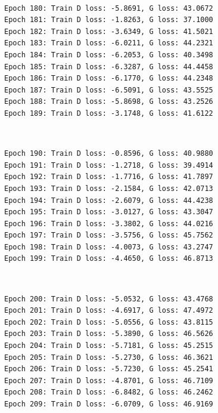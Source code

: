 \documentclass[11pt]{article}
\begin{document}
    \begin{center}
    \end{center}
    { \hspace*{\fill} \\}
    
    \begin{Verbatim}[commandchars=\\\{\}]
Epoch 180: Train D loss: -5.8691, G loss: 43.0672
Epoch 181: Train D loss: -1.8263, G loss: 37.1000
Epoch 182: Train D loss: -3.6349, G loss: 41.5021
Epoch 183: Train D loss: -6.0211, G loss: 44.2321
Epoch 184: Train D loss: -6.2053, G loss: 40.3498
Epoch 185: Train D loss: -6.3287, G loss: 44.4458
Epoch 186: Train D loss: -6.1770, G loss: 44.2348
Epoch 187: Train D loss: -6.5091, G loss: 43.5525
Epoch 188: Train D loss: -5.8698, G loss: 43.2526
Epoch 189: Train D loss: -3.1748, G loss: 41.6122

    \end{Verbatim}

    \begin{center}
    \end{center}
    { \hspace*{\fill} \\}
    
    \begin{Verbatim}[commandchars=\\\{\}]
Epoch 190: Train D loss: -0.8596, G loss: 40.9880
Epoch 191: Train D loss: -1.2718, G loss: 39.4914
Epoch 192: Train D loss: -1.7716, G loss: 41.7897
Epoch 193: Train D loss: -2.1584, G loss: 42.0713
Epoch 194: Train D loss: -2.6079, G loss: 44.4238
Epoch 195: Train D loss: -3.0127, G loss: 43.3047
Epoch 196: Train D loss: -3.3802, G loss: 44.0216
Epoch 197: Train D loss: -3.5756, G loss: 45.7562
Epoch 198: Train D loss: -4.0073, G loss: 43.2747
Epoch 199: Train D loss: -4.4650, G loss: 46.8713

    \end{Verbatim}

    \begin{center}
    \end{center}
    { \hspace*{\fill} \\}
    
    \begin{Verbatim}[commandchars=\\\{\}]
Epoch 200: Train D loss: -5.0532, G loss: 43.4768
Epoch 201: Train D loss: -4.6917, G loss: 47.4972
Epoch 202: Train D loss: -5.0556, G loss: 43.8115
Epoch 203: Train D loss: -5.3890, G loss: 46.5626
Epoch 204: Train D loss: -5.7181, G loss: 45.2515
Epoch 205: Train D loss: -5.2730, G loss: 46.3621
Epoch 206: Train D loss: -5.7230, G loss: 45.2541
Epoch 207: Train D loss: -4.8701, G loss: 46.7109
Epoch 208: Train D loss: -6.8482, G loss: 46.2462
Epoch 209: Train D loss: -6.0709, G loss: 46.9169

    \end{Verbatim}
\end{document}
